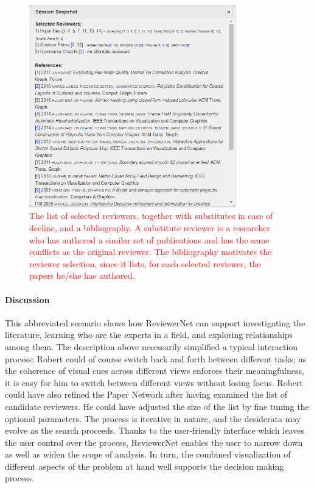\begin{figure}[!pt]
\centering
\includegraphics[width=0.8\textwidth]{fig/reviewers.png}
\caption{\textcolor{red}{The list of selected reviewers, together with substitutes in case of decline, and a bibliography. A substitute reviewer is a researcher who has authored a similar set of publications and has the same conflicts as the original reviewer. The bibliography motivates the  reviewer selection, since it lists, for each selected reviewer, the papers he/she has authored.}}%
\label{fig:list}
\end{figure}

 

\paragraph*{Discussion} 
This abbreviated scenario shows how ReviewerNet can support investigating the literature, learning who are the experts in a field, and exploring relationships among them. The description above necessarily simplified a typical interaction process: Robert could of course switch back and forth between different tasks; as the coherence of visual cues across different views enforces their meaningfulness, it is easy for him to switch between different views without losing focus. Robert could have also refined the Paper Network after having examined the list of candidate reviewers. He could have adjusted the size of the list by fine tuning the optional parameters. The process is iterative in nature, and the desiderata may evolve as the search proceeds. Thanks to the user-friendly interface which leaves the user control over the process, ReviewerNet enables the user to narrow down as well as widen the scope of analysis. In turn, the combined visualization of different aspects of the problem at hand well supports the decision making process.     
